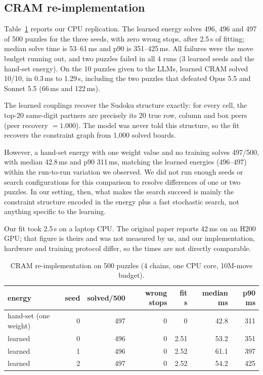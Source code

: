 \documentclass{article} %
\begin{document}
\subsection{CRAM re-implementation}
Table~\ref{tab:cram} reports our CPU replication. The learned energy solves 496, 496 and 497 of 500 puzzles for the three seeds, with zero wrong stops, after 2.5\,s of fitting; median solve time is 53--61\,ms and p90 is 351--425\,ms. All failures were the move budget running out, and two puzzles failed in all 4 runs (3 learned seeds and the hand-set energy). On the 10 puzzles given to the LLMs, learned CRAM solved 10/10, in 0.3\,ms to 1.29\,s, including the two puzzles that defeated Opus 5.5 and Sonnet 5.5 (66\,ms and 122\,ms).

The learned couplings recover the Sudoku structure exactly: for every cell, the top-20 same-digit partners are precisely its 20 true row, column and box peers (peer recovery $=1.000$). The model was never told this structure, so the fit recovers the constraint graph from 1{,}000 solved boards.

However, a hand-set energy with one weight value and no training solves 497/500, with median 42.8\,ms and p90 311\,ms, matching the learned energies (496--497) within the run-to-run variation we observed. We did not run enough seeds or search configurations for this comparison to resolve differences of one or two puzzles. In our setting, then, what makes the search succeed is mainly the constraint structure encoded in the energy plus a fast stochastic search, not anything specific to the learning.

Our fit took 2.5\,s on a laptop CPU. The original paper reports 42\,ms on an H200 GPU; that figure is theirs and was not measured by us, and our implementation, hardware and training protocol differ, so the times are not directly comparable.

\begin{table}[t]
\centering
\caption{CRAM re-implementation on 500 puzzles (4 chains, one CPU core, 10M-move budget).}
\label{tab:cram}
\small
\begin{tabular}{lrrrrrr}
\toprule
energy & seed & solved/500 & wrong stops & fit s & median ms & p90 ms \\
\midrule
hand-set (one weight) & 0 & 497 & 0 & 0 & 42.8 & 311 \\
learned & 0 & 496 & 0 & 2.51 & 53.2 & 351 \\
learned & 1 & 496 & 0 & 2.52 & 61.1 & 397 \\
learned & 2 & 497 & 0 & 2.52 & 54.2 & 425 \\
\bottomrule
\end{tabular}
\end{table}
\end{document}
